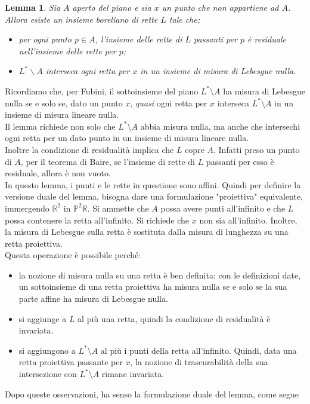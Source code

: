 \documentclass[a4paper, twoside,openright]{article}
\newcommand{\R}{\mathbb{R}}
\renewcommand{\P}{\mathbb{P}}
\newcommand{\<}{\langle}
\renewcommand{\>}{\rangle}
\newtheorem{lemma}[teo]{Lemma}
\begin{document}
\begin{lemma} \label{lemma1}
Sia $A$ aperto del piano e sia $x$ un punto che non appartiene ad $A$. Allora esiste un insieme boreliano di rette $L$ tale che:
\begin{itemize}
	\item per ogni punto $p \in A$, l'insieme delle rette di $L$ passanti per $p$ è residuale nell'insieme delle rette per $p$;
	\item $L^{*} \backslash A$ interseca ogni retta per $x$ in un insieme di misura di Lebesgue nulla.
\end{itemize}
\end{lemma}

Ricordiamo che, per Fubini, il sottoinsieme del piano $L^* \setminus A$ ha misura di Lebesgue nulla se e solo se, dato un punto $x$, \emph{quasi} ogni retta per $x$ interseca $L^* \setminus A$ in un insieme di misura lineare nulla.\\
Il lemma richiede non solo che $L^* \setminus A$ abbia misura nulla, ma anche che intersechi ogni retta per un dato punto in un insieme di misura lineare nulla. \\
Inoltre la condizione di residualità implica che $L$ copre $A$. Infatti preso un punto di $A$, per il teorema di Baire, se l'insieme di rette di $L$ passanti per esso è residuale, allora è non vuoto.\\

In questo lemma, i punti e le rette in questione sono affini. Quindi per definire la versione duale del lemma, bisogna dare una formulazione "proiettiva" equivalente, immergendo $\R^2$ in $\P^2\R$. Si ammette che $A$ possa avere punti all'infinito e che $L$ possa contenere la retta all'infinito. Si richiede che $x$ non sia all'infinito. Inoltre, la misura di Lebesgue sulla retta è sostituta dalla misura di lunghezza su una retta proiettiva.\\
Questa operazione è possibile perché:
\begin{itemize}
	\item la nozione di misura nulla su una retta è ben definita: con le definizioni date, un sottoinsieme di una retta proiettiva ha misura nulla se e solo se la sua parte affine ha misura di Lebesgue nulla. 
	\item si aggiunge a $L$ al più una retta, quindi la condizione di residualità è invariata.
	\item si aggiungono a $L^* \setminus A$ al più i punti della retta all'infinito. Quindi, data una retta proiettiva passante per $x$, la nozione di trascurabilità della sua intersezione con $L^* \setminus A$ rimane invariata.
\end{itemize}
Dopo queste osservazioni, ha senso la formulazione duale del lemma, come segue 
\end{document}
